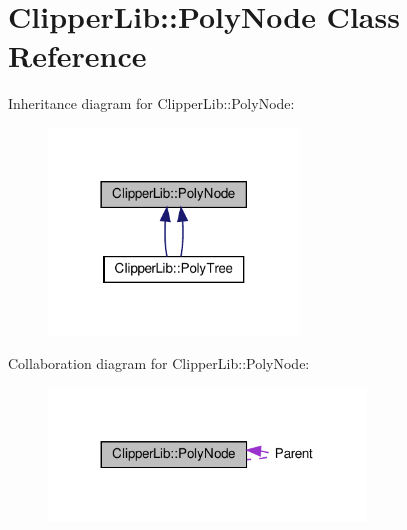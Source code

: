 \hypertarget{classClipperLib_1_1PolyNode}{}\section{Clipper\+Lib\+:\+:Poly\+Node Class Reference}
\label{classClipperLib_1_1PolyNode}


Inheritance diagram for Clipper\+Lib\+:\+:Poly\+Node\+:
\nopagebreak
\begin{figure}[H]
\begin{center}
\leavevmode
\includegraphics[width=189pt]{classClipperLib_1_1PolyNode__inherit__graph}
\end{center}
\end{figure}


Collaboration diagram for Clipper\+Lib\+:\+:Poly\+Node\+:
\nopagebreak
\begin{figure}[H]
\begin{center}
\leavevmode
\includegraphics[width=239pt]{classClipperLib_1_1PolyNode__coll__graph}
\end{center}
\end{figure}
